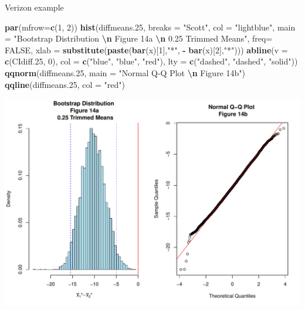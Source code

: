\documentclass[
  ignorenonframetext,
]{beamer}
\newenvironment{Shaded}{\begin{snugshade}}{\end{snugshade}}
\newcommand{\AttributeTok}[1]{\textcolor[rgb]{0.13,0.29,0.53}{#1}}
\newcommand{\ConstantTok}[1]{\textcolor[rgb]{0.56,0.35,0.01}{#1}}
\newcommand{\DecValTok}[1]{\textcolor[rgb]{0.00,0.00,0.81}{#1}}
\newcommand{\FloatTok}[1]{\textcolor[rgb]{0.00,0.00,0.81}{#1}}
\newcommand{\FunctionTok}[1]{\textcolor[rgb]{0.13,0.29,0.53}{\textbf{#1}}}
\newcommand{\NormalTok}[1]{#1}
\newcommand{\SpecialCharTok}[1]{\textcolor[rgb]{0.81,0.36,0.00}{\textbf{#1}}}
\newcommand{\StringTok}[1]{\textcolor[rgb]{0.31,0.60,0.02}{#1}}
\begin{document}
\begin{frame}[fragile]{Verizon example}
\protect\hypertarget{verizon-example-10}{}
\tiny

\begin{Shaded}
\begin{Highlighting}[]
\FunctionTok{par}\NormalTok{(}\AttributeTok{mfrow=}\FunctionTok{c}\NormalTok{(}\DecValTok{1}\NormalTok{, }\DecValTok{2}\NormalTok{))}
\FunctionTok{hist}\NormalTok{(diffmeans}\FloatTok{.25}\NormalTok{, }\AttributeTok{breaks =} \StringTok{"Scott"}\NormalTok{, }\AttributeTok{col =} \StringTok{"lightblue"}\NormalTok{, }
     \AttributeTok{main =} \StringTok{"Bootstrap Distribution }\SpecialCharTok{\textbackslash{}n}\StringTok{ Figure 14a }\SpecialCharTok{\textbackslash{}n}\StringTok{ 0.25 Trimmed Means"}\NormalTok{, }
     \AttributeTok{freq=} \ConstantTok{FALSE}\NormalTok{, }\AttributeTok{xlab =} \FunctionTok{substitute}\NormalTok{(}\FunctionTok{paste}\NormalTok{(}\FunctionTok{bar}\NormalTok{(x)[}\DecValTok{1}\NormalTok{],}\StringTok{"*"}\NormalTok{, }\SpecialCharTok{{-}} \FunctionTok{bar}\NormalTok{(x)[}\DecValTok{2}\NormalTok{],}\StringTok{"*"}\NormalTok{)))}
\FunctionTok{abline}\NormalTok{(}\AttributeTok{v =} \FunctionTok{c}\NormalTok{(CIdiff}\FloatTok{.25}\NormalTok{, }\DecValTok{0}\NormalTok{), }\AttributeTok{col =} \FunctionTok{c}\NormalTok{(}\StringTok{"blue"}\NormalTok{, }\StringTok{"blue"}\NormalTok{, }\StringTok{"red"}\NormalTok{), }
       \AttributeTok{lty =} \FunctionTok{c}\NormalTok{(}\StringTok{"dashed"}\NormalTok{, }\StringTok{"dashed"}\NormalTok{, }\StringTok{"solid"}\NormalTok{))}
\FunctionTok{qqnorm}\NormalTok{(diffmeans}\FloatTok{.25}\NormalTok{, }\AttributeTok{main =} \StringTok{"Normal Q{-}Q Plot }\SpecialCharTok{\textbackslash{}n}\StringTok{ Figure 14b"}\NormalTok{)}
\FunctionTok{qqline}\NormalTok{(diffmeans}\FloatTok{.25}\NormalTok{, }\AttributeTok{col =} \StringTok{"red"}\NormalTok{)}
\end{Highlighting}
\end{Shaded}

\begin{center}\includegraphics[width=0.6\linewidth,height=0.4\textheight]{Week10_Lect_files/figure-beamer/unnamed-chunk-39-1} \end{center}


\end{frame}
\end{document}

